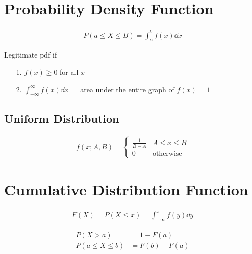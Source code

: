 \documentclass[paper=A4, pagesize, fontsize=7pt, DIV=calc]{scrartcl}
\begin{document}
\begin{minipage}[t]{.45\linewidth}
  \section{Probability Density Function}
  \begin{minipage}{.5\linewidth}
    \begin{align*}
      P(a \le X \le B) = \int_{a}^{b} f(x) \dd{x}
    \end{align*}
  \end{minipage}%
  \begin{minipage}{.5\linewidth}
    Legitimate pdf if
    \begin{enumerate}
      \item[1.]
        $f(x) \ge 0$ for all $x$
      \item[2.]
        $\int_{-\infty}^{\infty} f(x) \dd{x} = $ area under the entire graph of $f(x) = 1$
    \end{enumerate}
  \end{minipage}

  \subsection{Uniform Distribution}
  \begin{align*}
    f(x; A, B) = \begin{cases}
      \frac{1}{B - A} & A \le x \le B \\
      0               & \text{otherwise}
    \end{cases}
  \end{align*}

  \section{Cumulative Distribution Function}
  \begin{minipage}{.5\linewidth}
    \begin{align*}
      F(X) = P(X \le x) = \int_{-\infty}^{x} f(y) \dd{y}
    \end{align*}
  \end{minipage}%
  \begin{minipage}{.5\linewidth}
    \begin{align*}
      P(X > a) &= 1 - F(a) \\
      P(a \le X \le b) &= F(b) - F(a) \\
    \end{align*}
  \end{minipage}
\end{minipage}\qquad
\end{document}
